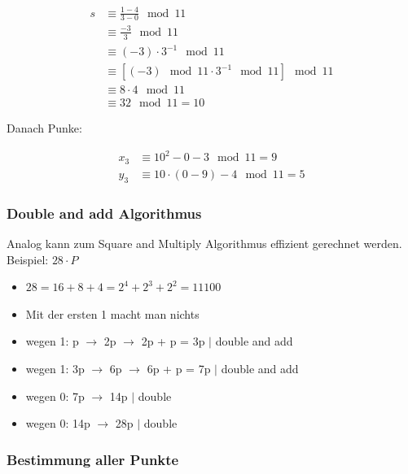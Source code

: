 \documentclass[12pt]{scrartcl}
\begin{document}
\begin{align*}
    s   &\equiv \frac{1 - 4}{3 - 0}                     \mod 11 \\
        &\equiv \frac{-3}{3}                            \mod 11 \\
        &\equiv (-3) \cdot 3^{-1}                       \mod 11 \\
        &\equiv [(-3) \mod 11 \cdot 3^{-1}  \mod 11]    \mod 11 \\
        &\equiv 8 \cdot 4                               \mod 11 \\
        &\equiv 32                                      \mod 11 = 10
\end{align*}

Danach Punke:

\begin{align*}
    x_3 &\equiv 10^2 - 0 - 3 \mod 11 = 9 \\
    y_3 &\equiv 10 \cdot (0 - 9) - 4 \mod 11 = 5
\end{align*}

\subsubsection{Double and add Algorithmus}

Analog kann zum Square and Multiply Algorithmus effizient gerechnet werden.\\

Beispiel: $28 \cdot P$

\begin{itemize}
    \item $28 = 16 + 8 + 4 = 2^4 + 2^3 + 2^2 = 11100$
    \item Mit der ersten 1 macht man nichts
    \item wegen 1: p $\rightarrow$ 2p $\rightarrow$ 2p + p = 3p $|$ double and add
    \item wegen 1: 3p $\rightarrow$ 6p $\rightarrow$ 6p + p = 7p $|$ double and add
    \item wegen 0: 7p $\rightarrow$ 14p $|$ double
    \item wegen 0: 14p $\rightarrow$ 28p $|$ double
\end{itemize}




\newpage
\subsubsection{Bestimmung aller Punkte}
\end{document}
